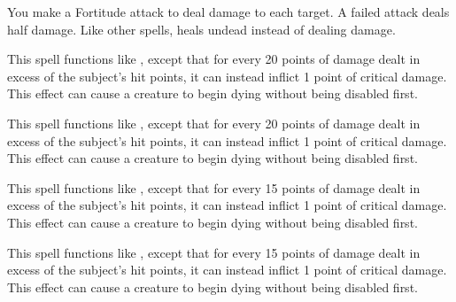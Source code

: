 \spelleffect You make a Fortitude attack to deal damage to each target. A failed attack deals half damage. Like other  spells,  heals undead instead of dealing damage.

\spelleffect This spell functions like , except that for every 20 points of damage dealt in excess of the subject's hit points, it can instead inflict 1 point of critical damage.
\spellnotes This effect can cause a creature to begin dying without being disabled first.

\spelleffect This spell functions like , except that for every 20 points of damage dealt in excess of the subject's hit points, it can instead inflict 1 point of critical damage.
\spellnotes This effect can cause a creature to begin dying without being disabled first.

\spelleffect This spell functions like , except that for every 15 points of damage dealt in excess of the subject's hit points, it can instead inflict 1 point of critical damage.
\spellnotes This effect can cause a creature to begin dying without being disabled first.

\spelleffect This spell functions like , except that for every 15 points of damage dealt in excess of the subject's hit points, it can instead inflict 1 point of critical damage.
\spellnotes This effect can cause a creature to begin dying without being disabled first.

